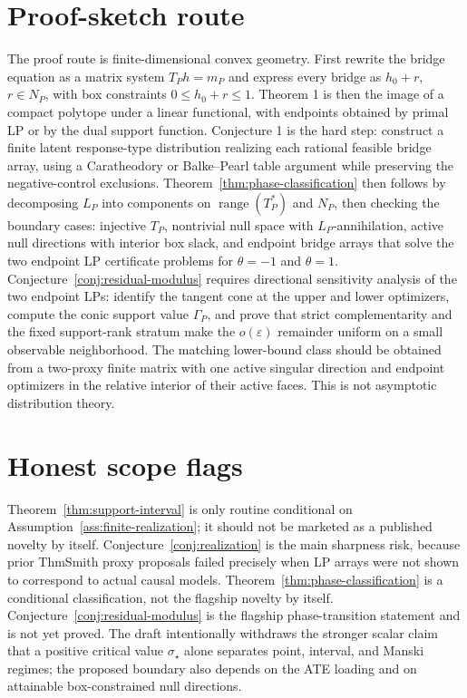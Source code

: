 \documentclass[11pt]{article}
\theoremstyle{definition}
\theoremstyle{plain}
\theoremstyle{remark}
\begin{document}
\section{Proof-sketch route}
The proof route is finite-dimensional convex geometry.  First rewrite the
bridge equation as a matrix system \(T_Ph=m_P\) and express every bridge as
\(h_0+r\), \(r\in N_P\), with box constraints \(0\le h_0+r\le1\).  Theorem
1 is then the image of a compact polytope under a linear functional, with
endpoints obtained by primal LP or by the dual support function.  Conjecture
1 is the hard step: construct a finite latent response-type distribution
realizing each rational feasible bridge array, using a Caratheodory or
Balke--Pearl table argument while preserving the negative-control exclusions.
Theorem~\ref{thm:phase-classification} then follows by decomposing \(L_P\)
into components on \(\operatorname{range}(T_P^*)\) and \(N_P\), then checking
the boundary cases: injective \(T_P\), nontrivial null space with
\(L_P\)-annihilation, active null directions with interior box slack, and
endpoint bridge arrays that solve the two endpoint LP certificate problems
for \(\theta=-1\) and \(\theta=1\).
Conjecture~\ref{conj:residual-modulus} requires directional sensitivity
analysis of the two endpoint LPs: identify the tangent cone at the upper and
lower optimizers, compute the conic support value \(\Gamma_P\), and prove
that strict complementarity and the fixed support-rank stratum make the
\(o(\varepsilon)\) remainder uniform on a small observable neighborhood.  The matching lower-bound class should be
obtained from a two-proxy finite matrix with one active singular direction
and endpoint optimizers in the relative interior of their active faces.  This
is not asymptotic distribution theory.

\section{Honest scope flags}
Theorem~\ref{thm:support-interval} is only routine conditional on
Assumption~\ref{ass:finite-realization}; it should not be marketed as a
published novelty by itself.  Conjecture~\ref{conj:realization} is the main
sharpness risk, because prior ThmSmith proxy proposals failed precisely when
LP arrays were not shown to correspond to actual causal models.
Theorem~\ref{thm:phase-classification} is a conditional classification, not
the flagship novelty by itself.  Conjecture~\ref{conj:residual-modulus} is
the flagship phase-transition statement and is not yet proved.  The draft
intentionally withdraws the stronger scalar claim that a
positive critical value \(\sigma_\star\) alone separates point, interval, and
Manski regimes; the proposed boundary also depends on the ATE loading and on
attainable box-constrained null directions.
\end{document}

